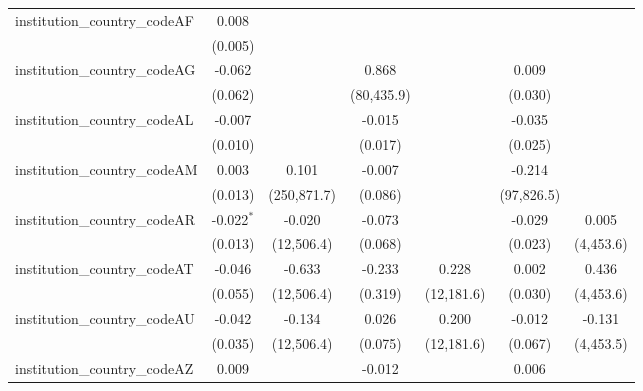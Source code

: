 \begin{tabular}{lcccccc}
   institution\_country\_codeAF          & 0.008          &               &               &               &               &   \\   
                                         & (0.005)        &               &               &               &               &   \\   
   institution\_country\_codeAG          & -0.062         &               & 0.868         &               & 0.009         &   \\   
                                         & (0.062)        &               & (80,435.9)    &               & (0.030)       &   \\   
   institution\_country\_codeAL          & -0.007         &               & -0.015        &               & -0.035        &   \\   
                                         & (0.010)        &               & (0.017)       &               & (0.025)       &   \\   
   institution\_country\_codeAM          & 0.003          & 0.101         & -0.007        &               & -0.214        &   \\   
                                         & (0.013)        & (250,871.7)   & (0.086)       &               & (97,826.5)    &   \\   
   institution\_country\_codeAR          & -0.022$^{*}$   & -0.020        & -0.073        &               & -0.029        & 0.005\\   
                                         & (0.013)        & (12,506.4)    & (0.068)       &               & (0.023)       & (4,453.6)\\   
   institution\_country\_codeAT          & -0.046         & -0.633        & -0.233        & 0.228         & 0.002         & 0.436\\   
                                         & (0.055)        & (12,506.4)    & (0.319)       & (12,181.6)    & (0.030)       & (4,453.6)\\   
   institution\_country\_codeAU          & -0.042         & -0.134        & 0.026         & 0.200         & -0.012        & -0.131\\   
                                         & (0.035)        & (12,506.4)    & (0.075)       & (12,181.6)    & (0.067)       & (4,453.5)\\   
   institution\_country\_codeAZ          & 0.009          &               & -0.012        &               & 0.006         &   \\   

\end{tabular}
